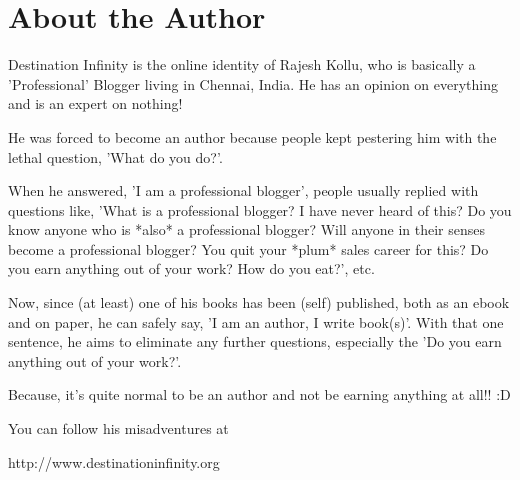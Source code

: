 \chapter{About the Author}

Destination Infinity is the online identity of Rajesh Kollu, who is basically a
'Professional' Blogger living in Chennai, India. He has an opinion on everything
and is an expert on nothing!

He was forced to become an author because people kept pestering him with the
lethal question, 'What do you do?'.

When he answered, 'I am a professional blogger', people usually replied with
questions like, 'What is a professional blogger? I have never heard of this? Do
you know anyone who is *also* a professional blogger? Will anyone in their
senses become a professional blogger? You quit your *plum* sales career for
this? Do you earn anything out of your work? How do you eat?', etc.

Now, since (at least) one of his books has been (self) published, both as an
ebook and on paper, he can safely
say, 'I am an author, I write book(s)'. With that one sentence, he aims to
eliminate any further questions, especially the 'Do you earn anything out of
your work?'.

Because, it's quite normal to be an author and not be earning anything at all!!
:D

You can follow his misadventures at

\vspace{1ex}
\centerline{http://www.destinationinfinity.org}